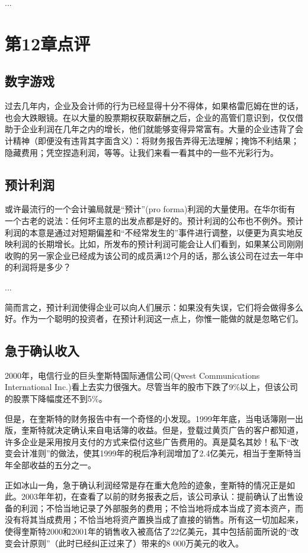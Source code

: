 \documentclass[12pt,oneside]{book}
\begin{document}
...



\section{第12章点评}
\subsection{数字游戏}
过去几年内，企业及会计师的行为已经显得十分不得体，如果格雷厄姆在世的话，也会大跌眼镜。在以大量的股票期权获取薪酬之后，企业的高管们意识到，仅仅借助于企业利润在几年之内的增长，他们就能够变得异常富有。大量的企业违背了会计精神（即便没有违背其字面含义）：将财务报告弄得无法理解；掩饰不利结果；隐藏费用；凭空捏造利润，等等。让我们来看一看其中的一些不光彩行为。

\subsection{预计利润}
或许最流行的一个会计骗局就是“预计”(pro forma)利润的大量使用。在华尔街有一个古老的说法：任何坏主意的出发点都是好的。预计利润的公布也不例外。预计利润的本意是通过对短期偏差和“不经常发生的”事件进行调整，以便更为真实地反映利润的长期增长。比如，所发布的预计利润可能会让人们看到，如果某公司刚刚收购的另一家企业已经成为该公司的成员满12个月的话，那么该公司在过去一年中的利润将是多少？

...

简而言之，预计利润使得企业可以向人们展示：如果没有失误，它们将会做得多么好。作为一个聪明的投资者，在预计利润这一点上，你惟一能做的就是忽略它们。

\subsection{急于确认收入}
2000年，电信行业的巨头奎斯特国际通信公司(Qwest Communications International Inc.)看上去实力很强大。尽管当年的股市下跌了9\%以上，但该公司的股票下降幅度还不到5\%。

但是，在奎斯特的财务报告中有一个奇怪的小发现。1999年年底，当电话簿刚一出版，奎斯特就决定确认来自电话簿的收益。但是，登载过黄页广告的客户都知道，许多企业是采用按月支付的方式来偿付这些广告费用的。真是莫名其妙！私下“改变会计准则”的做法，使其1999年的税后净利润增加了2.4亿美元，相当于奎斯特当年全部收益的五分之一。

正如冰山一角，急于确认利润经常是存在重大危险的迹象，奎斯特的情况正是如此。2003年年初，在查看了以前的财务报表之后，该公司承认：提前确认了出售设备的利润；不恰当地记录了外部服务的费用；不恰当地将成本当成了资本资产，而没有将其当成费用；不恰当地将资产置换当成了直接的销售。所有这一切加起来，使得奎斯特2000和2001年的销售收入被高估了22亿美元，其中包括前面所说的“改变会计原则”（此时已经纠正过来了）带来的8 000万美元的收入。
\end{document}
